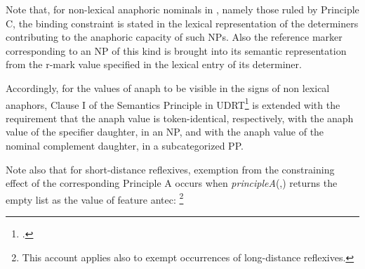 \documentclass[output=paper
,modfonts
,nonflat]{langsci/langscibook}
\begin{document}
Note that, for non-lexical anaphoric nominals in , namely those ruled
by Principle C, the binding constraint is stated in the lexical representation
of the determiners contributing to the anaphoric capacity of such NPs.
Also the reference marker corresponding to an NP of this kind is brought into 
its semantic representation from the {\sc r-mark} value
specified in the lexical entry of its determiner.

Accordingly, for the values of {\sc anaph} to be
visible in the signs of non lexical anaphors, 
Clause I of the Semantics Principle in UDRT\footnote{
\citep[p.12]{frank:sem95}.}
is extended with the
requirement that the {\sc anaph} value is token-identical,
respectively, with
the {\sc anaph} value of the specifier daughter, in an NP, and 
with the {\sc anaph} value of the nominal complement daughter, in 
a subcategorized PP.


Note also that for short-distance reflexives, exemption from the constraining effect
of the corresponding Principle A occurs when
\emph{principleA}(,)
returns the empty list as the value of feature {\sc antec}:%
%
\footnote{
This account applies also to exempt occurrences of 
long-distance reflexives.}
%

\avmoptions{}
\end{document}
